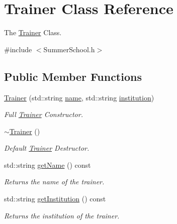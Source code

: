 \hypertarget{classTrainer}{}\section{Trainer Class Reference}
\label{classTrainer}


The \hyperlink{classTrainer}{Trainer} Class.  




{\ttfamily \#include $<$Summer\+School.\+h$>$}

\subsection*{Public Member Functions}
\begin{DoxyCompactItemize}
\item 
\hyperlink{classTrainer_ae033382eaedd47966c8667439376369a}{Trainer} (std\+::string \hyperlink{classTrainer_a6b58d4cfdb8d3482cb2c09dd366a6350}{name}, std\+::string \hyperlink{classTrainer_ae895aa7f146d8bf271399215d4ede36b}{institution})
\begin{DoxyCompactList}\small\item\em Full \hyperlink{classTrainer}{Trainer} Constructor. \end{DoxyCompactList}\item 
\hyperlink{classTrainer_aa3d993d1eb090f4111e12a710fe9d3f6}{$\sim$\+Trainer} ()
\begin{DoxyCompactList}\small\item\em Default \hyperlink{classTrainer}{Trainer} Destructor. \end{DoxyCompactList}\item 
std\+::string \hyperlink{classTrainer_a4bf23e8eaefc7c2f400b4ba14f2e1c69}{get\+Name} () const
\begin{DoxyCompactList}\small\item\em Returns the name of the trainer. \end{DoxyCompactList}\item 
std\+::string \hyperlink{classTrainer_a92ce4244bea56ae32c0ba33fdd959667}{get\+Institution} () const
\begin{DoxyCompactList}\small\item\em Returns the institution of the trainer. \end{DoxyCompactList}\end{DoxyCompactItemize}
